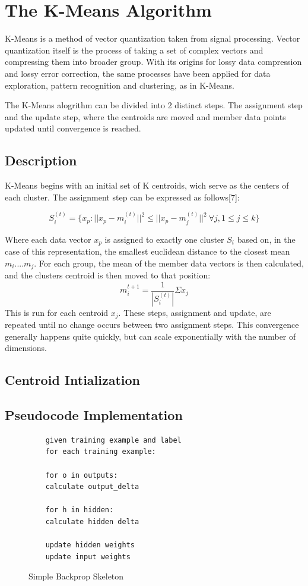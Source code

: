 \documentclass[journal]{IEEEtran}
\begin{document}
\section{The K-Means Algorithm}
K-Means is a method of vector quantization taken from signal processing. Vector quantization itself is the process of taking a set of complex vectors and compressing them into broader group. With its origins for lossy data compression and lossy error correction, the same processes have been applied for data exploration, pattern recognition and clustering, as in K-Means.

The K-Means alogrithm can be divided into 2 distinct steps. The assignment step and the update step, where the centroids are moved and member data points updated until convergence is reached.



\subsection{Description}
K-Means begins with an initial set of K centroids, wich serve as the centers of each cluster. The assignment step can be expressed as follows[7]:

$$ S_{i}^{(t)} = \{x_{p}: ||x_{p} -m_{i}^{(t)}||^{2 } \leq  ||x_{p} -m_{j}^{(t)}||^{2 } \ \forall j, 1 \leq j \leq k\} $$


Where each data vector $ x_{p} $ is assigned to exactly one cluster $S_{i}$ based on, in the case of this representation, the smallest euclidean distance to the closest mean $m_{i} ....m_{j}$. For each group, the mean of the member data vectors is then calculated, and the clusters centroid is then moved to that position:
$$m_{i}^{t+1} = \frac{1}{|S_{i}^{(t)}|}\Sigma x_{j}$$
This is run for each centroid $x_{j}$. These steps, assignment and update, are repeated until no change occurs between two assignment steps. This convergence generally happens quite quickly, but can scale exponentially with the number of dimensions.


\subsection{Centroid Intialization }

\subsection{Pseudocode Implementation}
\begin{figure}
	\caption{Simple Backprop Skeleton}
	\begin{lstlisting}
	given training example and label
	for each training example:
	
	for o in outputs:
	calculate output_delta
	
	for h in hidden:
	calculate hidden delta
	
	update hidden weights
	update input weights
	\end{lstlisting}
\end{figure}
\end{document}
